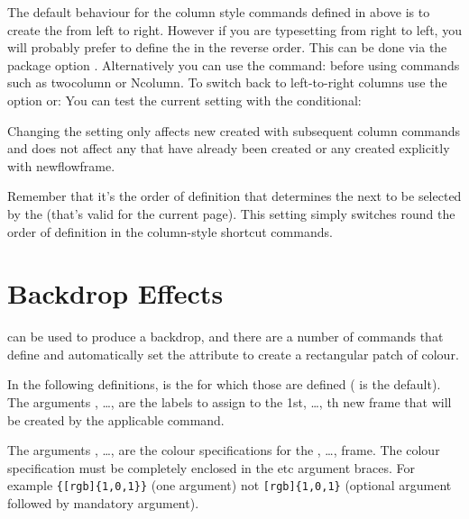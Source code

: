 \documentclass[fontsize=12pt]{scrbook}
\begin{document}
The default behaviour for the column style commands defined 
in  above is
to create the  from left to right. However if you are
typesetting from right to left, you will probably prefer to 
define the  in the reverse order. This can be
done via the package option . Alternatively you can use the
command:
before using commands such as \gls{twocolumn} or 
\gls{Ncolumn}. To switch back to left-to-right columns use the
 option or:
You can test the current setting with the conditional:

\begin{important}
Changing the setting only affects new  created
with subsequent column commands and does not affect any
 that have already been created or any
 created explicitly with \gls{newflowframe}.
\end{important}

Remember that it's the order of definition that determines 
the next  to be selected by the
 (that's valid for the current page). 
This setting simply switches round the order
of definition in the column-style shortcut commands.

\section{Backdrop Effects}\label{sec:backdrop}

 can be used to produce a backdrop, and there
are a number of commands that define  and
automatically set the  attribute to
create a rectangular patch of colour.

In the following definitions,  is the 
for which those  are defined ( is
the default).  The arguments , \ldots,  are the
labels to assign to the 1st, \ldots, th new frame that will
be created by the applicable command.

The arguments , \ldots,  are the colour
specifications for the , \ldots,  frame.  The colour
specification must be completely enclosed in the  etc
argument braces. For example \verb"{[rgb]{1,0,1}}" (one argument)
not \verb"[rgb]{1,0,1}" (optional argument followed by mandatory
argument).
\end{document}
